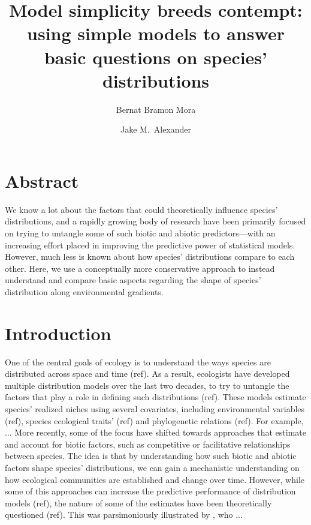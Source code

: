 \documentclass[11pt, a4paper]{article}
\title{\vspace{-1cm}
Model simplicity breeds contempt: using simple models to answer basic questions on species' distributions}
\author[1,*]{\normalsize Bernat Bramon Mora}
\author[1]{\normalsize Jake M.\ Alexander}
\affil[1]{\footnotesize Institute of Integrative Biology, ETH Zürich, Zürich, Switzerland}
\affil[*]{\footnotesize  bernat.bramon@gmail.com}
\date{}
\begin{document}
\maketitle
\linenumbers

\section*{Abstract}
We know a lot about the factors that could theoretically influence species' distributions, and a rapidly growing body of research have been primarily focused on trying to untangle some of such biotic and abiotic predictors---with an increasing effort placed in improving the predictive power of statistical models. However, much less is known about how species' distributions compare to each other. Here, we use a conceptually more conservative approach to instead understand and compare basic aspects regarding the shape of species' distribution along environmental gradients.

\section*{Introduction}


One of the central goals of ecology is to understand the ways species are distributed across space and time (ref). As a result, ecologists have developed multiple distribution models over the last two decades, to try to untangle the factors that play a role in defining such distributions (ref). These models estimate species' realized niches using several covariates, including environmental variables (ref), species ecological traits' (ref) and phylogenetic relations (ref). For example, ... More recently, some of the focus have shifted towards approaches that estimate and account for biotic factors, such as competitive or facilitative relationships between species. The idea is that by understanding how such biotic and abiotic factors shape species' distributions, we can gain a mechanistic understanding on how ecological communities are established and change over time. However, while some of this approaches can increase the predictive performance of distribution models (ref), the nature of some of the estimates have been theoretically questioned (ref). This was parsimoniously illustrated by \citealt{bla bla}, who ...


\end{document}
